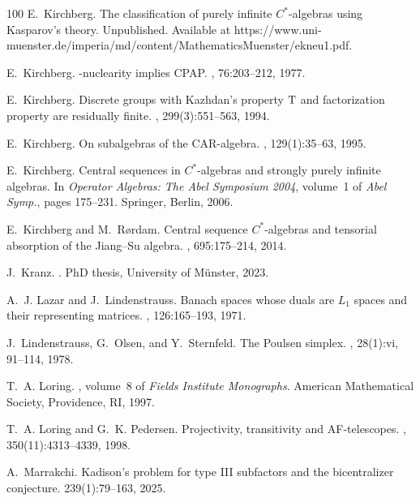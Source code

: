 \documentclass[a4paper,11pt]{amsart}
\theoremstyle{definition}
\numberwithin{equation}{section}
\numberwithin{theorem}{section}
\begin{document}
\begin{thebibliography}{100}
E.~Kirchberg.
\newblock The classification of purely infinite {$C^*$}-algebras using
  {K}asparov's theory.
\newblock Unpublished. Available at
  https://www.uni-muenster.de/imperia/md/content/MathematicsMuenster/ekneu1.pdf.

E.~Kirchberg.
-nuclearity implies {CPAP}.
, 76:203--212, 1977.

E.~Kirchberg.
\newblock Discrete groups with {K}azhdan's property {${\rm T}$} and
  factorization property are residually finite.
, 299(3):551--563, 1994.

E.~Kirchberg.
\newblock On subalgebras of the {CAR}-algebra.
, 129(1):35--63, 1995.

E.~Kirchberg.
\newblock Central sequences in {$C^*$}-algebras and strongly purely infinite
  algebras.
\newblock In {\em Operator {A}lgebras: {T}he {A}bel {S}ymposium 2004}, volume~1
  of {\em Abel Symp.}, pages 175--231. Springer, Berlin, 2006.

E.~Kirchberg and M.~R{\o}rdam.
\newblock Central sequence {$C^*$}-algebras and tensorial absorption of the
  {J}iang--{S}u algebra.
, 695:175--214, 2014.

J.~Kranz.
.
\newblock PhD thesis, University of M\"unster, 2023.

A.~J. Lazar and J.~Lindenstrauss.
\newblock Banach spaces whose duals are {$L_{1}$} spaces and their representing
  matrices.
, 126:165--193, 1971.

J.~Lindenstrauss, G.~Olsen, and Y.~Sternfeld.
\newblock The {P}oulsen simplex.
, 28(1):vi, 91--114, 1978.

T.~A. Loring.
,
  volume~8 of {\em Fields Institute Monographs}.
\newblock American Mathematical Society, Providence, RI, 1997.

T.~A. Loring and G.~K. Pedersen.
\newblock Projectivity, transitivity and {AF}-telescopes.
, 350(11):4313--4339, 1998.

A.~Marrakchi.
\newblock Kadison's problem for type {III} subfactors and the bicentralizer
  conjecture.
 239(1):79--163, 2025.


\end{thebibliography}
\end{document}
